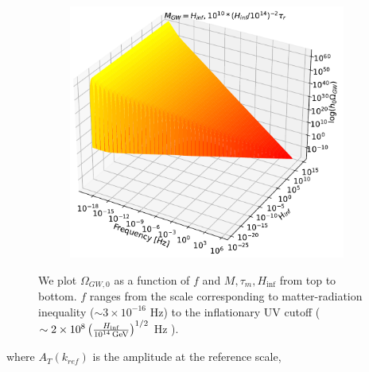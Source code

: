 \documentclass[prd,twocolumn,aps,psfig,nofootinbib,nobibnotes,superscriptaddress,preprintnumbers,times]{revtex4-2}
\newcommand{\GeV}{\,{\rm GeV}}
\begin{document}
\begin{figure}[H]
\begin{subfigure}{.5\textwidth}
  \centering
  \includegraphics[width=.82\linewidth]{fig/fig4c.pdf}  
  \label{fig:contour-c}
\end{subfigure}
\caption{We plot $\Omega_{GW,0}$ as a function of $f$ and $M, \tau_m, H_{\inf}$ from top to bottom. $f$ ranges from the scale corresponding to matter-radiation inequality ($\sim 3\times10^{-16}$ Hz) to the inflationary UV cutoff ($\sim 2\times 10^8\left(\frac{H_{\inf}}{10^{14} \GeV}\right)^{1/2}$ Hz \cite{Fujita:2018}).} 
\label{fig:contours}
\end{figure}
\hspace{-1em}where $A_T(k_{ref})$ is the amplitude at the reference scale,
\onecolumngrid
\end{document}
